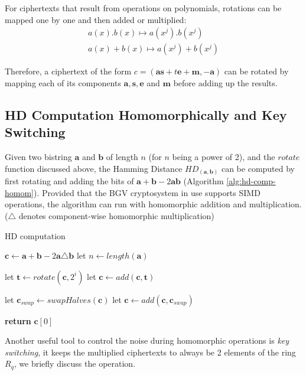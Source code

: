 \begin{description}
  For ciphertexts that result from operations on polynomials, rotations can be mapped one by one and then added or multiplied:
\begin{align*}
  a(x).b(x) \mapsto a(x^{j}).b(x^{j})\\
  a(x) + b(x) \mapsto a(x^{j}) + b(x^{j})
\end{align*}

Therefore, a ciphertext of the form
\(c = (\mathbf{as} + t \mathbf{e} + \mathbf{m}, -\mathbf{a})\) can be rotated by
 mapping each of its components \(\mathbf{a},\mathbf{s},\mathbf{e}\)
and \(\mathbf{m}\) before adding up the results.
\end{description}

\subsection{HD Computation Homomorphically and Key Switching}
Given two bistring \(\mathbf{a}\) and \(\mathbf{b}\) of length \(n\) (for \(n\)
being a power of 2), and the $rotate$ function discussed above, the Hamming
Distance \(HD_{(\mathbf{a,b})}\) can be computed by first rotating and adding the bits of \(\mathbf{a} + \mathbf{b} - 2\mathbf{ab}\) (Algorithm
\ref{alg:hd-comp-homom}). Provided that the BGV cryptosystem in use supports
SIMD operations, the algorithm can run with homomorphic addition and
multiplication. ($\triangle$ denotes component-wise homomorphic multiplication)

\begin{algorithm}
\caption{HD computation}\label{alg:hd-comp-homom}
\begin{algorithmic}[1]
  \State $\mathbf{c} \gets \mathbf{a} + \mathbf{b} - 2 \mathbf{a} \triangle \mathbf{b}$
  \State let $n \gets length(\mathbf{a})$
  
  \State let $\mathbf{t} \gets rotate(\mathbf{c}, 2^{i})$
  \State let $\mathbf{c} \gets add(\mathbf{c}, \mathbf{t})$

  \EndFor

  \State let $\mathbf{c}_{swap} \gets swapHalves(\mathbf{c})$
  \State let $\mathbf{c} \gets add(\mathbf{c},\mathbf{c}_{swap})$
  
\State \textbf{return} $\mathbf{c}[0]$
\EndProcedure
\end{algorithmic}
\end{algorithm}

Another useful tool to control the noise during homomorphic operations is
\textit{key switching}, it keeps the multiplied ciphertexts to always be 2
elements of the ring $R_{q}$, we briefly discuss the operation.

